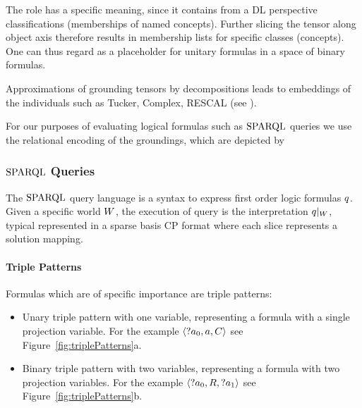 The role \rdftype has a specific meaning, since it contains from a DL perspective classifications (memberships of named concepts).
Further slicing the tensor along object axis therefore results in membership lists for specific classes (concepts).
One can thus regard \rdftype as a placeholder for unitary formulas in a space of binary formulas. 

Approximations of grounding tensors by decompositions leads to embeddings of the individuals such as Tucker, Complex, RESCAL (see \cite{nickel_review_2016}).

For  our purposes of evaluating logical formulas such as $\mathrm{SPARQL}$ queries we use the relational encoding of the groundings, which are depicted by
 \begin{center}
	
\end{center}
 
 
 
 
\subsubsection{$\mathrm{SPARQL}$ Queries}

The $\mathrm{SPARQL}$ query language is a syntax to express first order logic formulas $q$.
Given a specific world $W$, the execution of query is the interpretation ${q}|_{W}$, typical represented in a sparse basis CP format where each slice represents a solution mapping.

\paragraph{Triple Patterns}

Formulas which are of specific importance are triple patterns:
\begin{itemize}
	\item Unary triple pattern with one variable, representing a formula with a single projection variable.
	 	For the example $\braket{?a_{0},a,C}$ see Figure~\ref{fig:triplePatterns}a.
	\item Binary triple pattern with two variables, representing a formula with two projection variables.
		For the example  $\braket{?a_{0},R,?a_{1}}$ see Figure~\ref{fig:triplePatterns}b.
\end{itemize}

